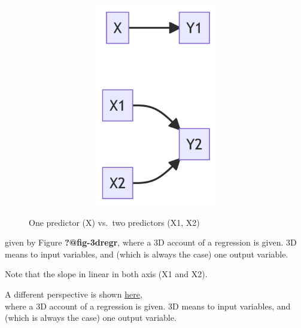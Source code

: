 \documentclass[
  letterpaper,
  DIV=11,
  numbers=noendperiod]{scrreprt}
\theoremstyle{definition}
\theoremstyle{definition}
\theoremstyle{remark}
\begin{document}
\begin{figure}

{\centering 

\begin{figure}[H]

{\centering \includegraphics[width=6.5in,height=3.5in]{./regression2_files/figure-latex/mermaid-figure-1.png}

}

\end{figure}

}

\caption{\label{fig-multregr}One predictor (X) vs.~two predictors (X1,
X2)}

\end{figure}

given by Figure \textbf{?@fig-3dregr}, where a 3D account of a
regression is given. 3D means to input variables, and (which is always
the case) one output variable.

\begin{tcolorbox}[enhanced jigsaw, colback=white, colbacktitle=quarto-callout-note-color!10!white, bottomrule=.15mm, opacityback=0, colframe=quarto-callout-note-color-frame, toptitle=1mm, opacitybacktitle=0.6, coltitle=black, bottomtitle=1mm, title=\textcolor{quarto-callout-note-color}{\faInfo}\hspace{0.5em}{Note}, titlerule=0mm, arc=.35mm, rightrule=.15mm, left=2mm, breakable, toprule=.15mm, leftrule=.75mm]
Note that the slope in linear in both axis (X1 and X2).
\end{tcolorbox}

A different perspective is shown
\href{https://upload.wikimedia.org/wikipedia/commons/a/ae/2d_multiple_linear_regression.gif?20161014061355}{here},\\
where a 3D account of a regression is given. 3D means to input
variables, and (which is always the case) one output variable.
\end{document}
